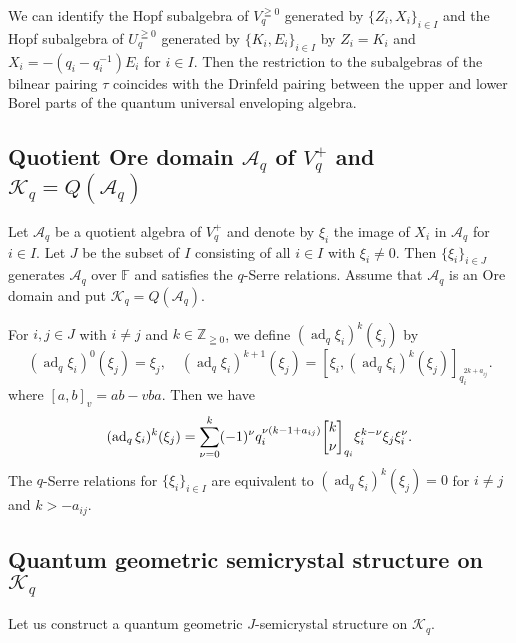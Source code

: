 \documentclass[12pt,a4paper]{article}
\newcommand\ad{\mathop{\mathrm{ad}}\nolimits}
\newcommand\A{{\mathcal A}}
\newcommand\K{{\mathcal K}}
\newcommand\Z{{\mathbb Z}} %
\newcommand\F{{\mathbb F}} %
\theoremstyle{plain} %
\theoremstyle{definition} %
\theoremstyle{definition} %
\numberwithin{theorem}{section}
\numberwithin{equation}{section}
\numberwithin{figure}{section}
\numberwithin{table}{section}
\begin{document}
We can identify the Hopf subalgebra of $V_q^{\geqq 0}$ 
generated by $\{Z_i,X_i\}_{i\in I}$ and 
the Hopf subalgebra of $U_q^{\geqq 0}$
generated by $\{K_i,E_i\}_{i\in I}$
by $Z_i=K_i$ and $X_i=-(q_i-q_i^{-1})E_i$ for $i\in I$.
Then the restriction to the subalgebras of the bilnear pairing $\tau$ 
coincides with the Drinfeld pairing 
between the upper and lower Borel parts of 
the quantum universal enveloping algebra.

\subsection{Quotient Ore domain $\A_q$ of $V_q^+$ and $\K_q=Q(\A_q)$}
\label{sec:Kq}

Let $\A_q$ be a quotient algebra of $V_q^+$
and denote by $\xi_i$ the image of $X_i$ in $\A_q$ for $i\in I$.
Let $J$ be the subset of $I$ consisting of all $i\in I$ with $\xi_i\ne 0$.
Then $\{\xi_i\}_{i\in J}$ generates $\A_q$ over $\F$ 
and satisfies the $q$-Serre relations.
Assume that $\A_q$ is an Ore domain and put $\K_q=Q(\A_q)$.


For $i,j\in J$ with $i\ne j$ and $k\in\Z_{\geqq0}$, 
we define $(\ad_q \xi_i)^k(\xi_j)$ by
\begin{equation*}
 (\ad_q \xi_i)^0(\xi_j) = \xi_j, \quad
 (\ad_q \xi_i)^{k+1}(\xi_j) = [\xi_i, (\ad_q \xi_i)^k(\xi_j)]_{q_i^{2k+a_{ij}}}.
\end{equation*}
where $[a,b]_v=ab-vba$.  Then we have
\begin{equation*}
 (\ad_q \xi_i)^k(\xi_j) = 
 \sum_{\nu=0}^k (-1)^\nu 
 q_i^{\nu(k-1+a_{ij})}\qbinom{k}{\nu}_{q_i} \xi_i^{k-\nu} \xi_j \xi_i^\nu.
\end{equation*}
The $q$-Serre relations for $\{\xi_i\}_{i\in I}$
are equivalent to $(\ad_q \xi_i)^k(\xi_j)=0$
for $i\ne j$ and $k>-a_{ij}$.

\subsection{Quantum geometric semicrystal structure on $\K_q$}
\label{sec:Kq-semicrys}

Let us construct a quantum geometric $J$-semicrystal structure on $\K_q$.
\end{document}
